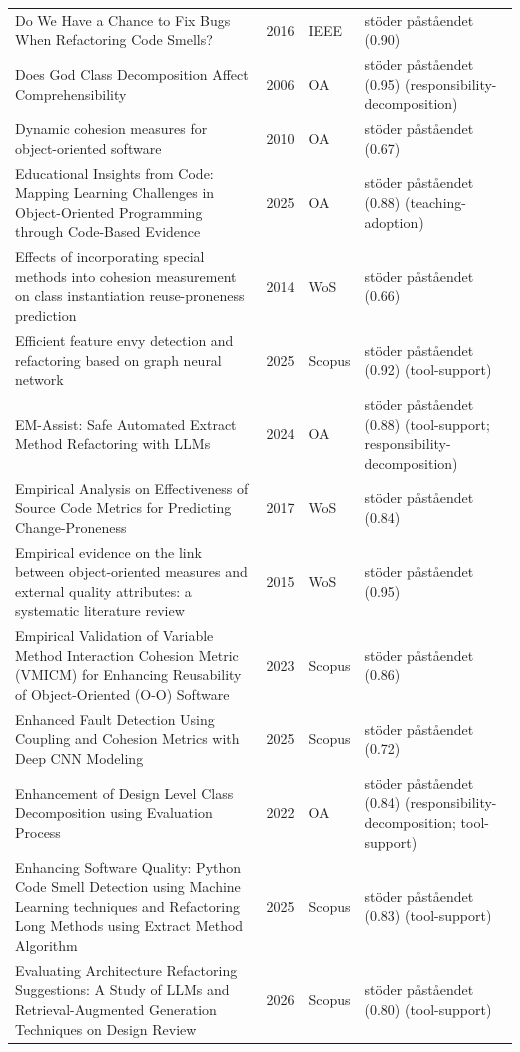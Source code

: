 \begin{longtable}{@{}%
  >{\raggedright\arraybackslash}p{}c%
  >{\raggedright\arraybackslash}p{}%
  >{\raggedright\arraybackslash}p{}@{}}
Do We Have a Chance to Fix Bugs When Refactoring Code Smells? & 2016 & IEEE & stöder påståendet (0.90) \\
Does God Class Decomposition Affect Comprehensibility & 2006 & OA & stöder påståendet (0.95) (responsibility-decomposition) \\
Dynamic cohesion measures for object-oriented software & 2010 & OA & stöder påståendet (0.67) \\
Educational Insights from Code: Mapping Learning Challenges in Object-Oriented Programming through Code-Based Evidence & 2025 & OA & stöder påståendet (0.88) (teaching-adoption) \\
Effects of incorporating special methods into cohesion measurement on class instantiation reuse-proneness prediction & 2014 & WoS & stöder påståendet (0.66) \\
Efficient feature envy detection and refactoring based on graph neural network & 2025 & Scopus & stöder påståendet (0.92) (tool-support) \\
EM-Assist: Safe Automated Extract Method Refactoring with LLMs & 2024 & OA & stöder påståendet (0.88) (tool-support; responsibility-decomposition) \\
Empirical Analysis on Effectiveness of Source Code Metrics for Predicting Change-Proneness & 2017 & WoS & stöder påståendet (0.84) \\
Empirical evidence on the link between object-oriented measures and external quality attributes: a systematic literature review & 2015 & WoS & stöder påståendet (0.95) \\
Empirical Validation of Variable Method Interaction Cohesion Metric (VMICM) for Enhancing Reusability of Object-Oriented (O-O) Software & 2023 & Scopus & stöder påståendet (0.86) \\
Enhanced Fault Detection Using Coupling and Cohesion Metrics with Deep CNN Modeling & 2025 & Scopus & stöder påståendet (0.72) \\
Enhancement of Design Level Class Decomposition using Evaluation Process & 2022 & OA & stöder påståendet (0.84) (responsibility-decomposition; tool-support) \\
Enhancing Software Quality: Python Code Smell Detection using Machine Learning techniques and Refactoring Long Methods using Extract Method Algorithm & 2025 & Scopus & stöder påståendet (0.83) (tool-support) \\
Evaluating Architecture Refactoring Suggestions: A Study of LLMs and Retrieval-Augmented Generation Techniques on Design Review & 2026 & Scopus & stöder påståendet (0.80) (tool-support) \\

\end{longtable}
